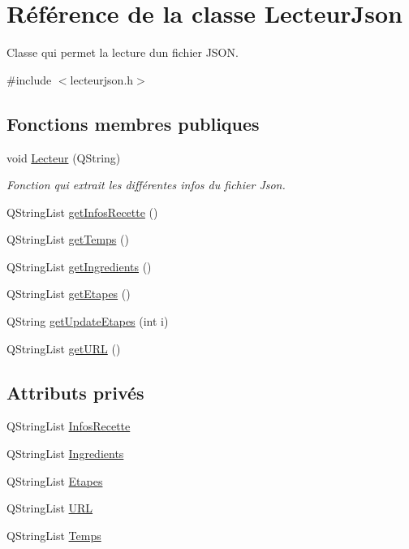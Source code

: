 \hypertarget{class_lecteur_json}{}\section{Référence de la classe Lecteur\+Json}
\label{class_lecteur_json}


Classe qui permet la lecture d\textquotesingle{}un fichier J\+S\+ON.  




{\ttfamily \#include $<$lecteurjson.\+h$>$}

\subsection*{Fonctions membres publiques}
\begin{DoxyCompactItemize}
\item 
void \hyperlink{class_lecteur_json_a6b74dbecd8cb87168fb2d36bc1a22f2b}{Lecteur} (Q\+String)
\begin{DoxyCompactList}\small\item\em Fonction qui extrait les différentes infos du fichier Json. \end{DoxyCompactList}\item 
Q\+String\+List \hyperlink{class_lecteur_json_a0c507870050e16de3688d310d1f3b65a}{get\+Infos\+Recette} ()
\item 
Q\+String\+List \hyperlink{class_lecteur_json_a88d73523c1775a8c7001b5abae152740}{get\+Temps} ()
\item 
Q\+String\+List \hyperlink{class_lecteur_json_a0c18d502de54aea85b4d76f1b2858423}{get\+Ingredients} ()
\item 
Q\+String\+List \hyperlink{class_lecteur_json_ab698142bf586bb224c35962525ce3915}{get\+Etapes} ()
\item 
Q\+String \hyperlink{class_lecteur_json_ad3a86b8dc577d1e6d77a66b8ece8442a}{get\+Update\+Etapes} (int i)
\item 
Q\+String\+List \hyperlink{class_lecteur_json_a4ceacda970b2b838bb41211decdd799f}{get\+U\+RL} ()
\end{DoxyCompactItemize}
\subsection*{Attributs privés}
\begin{DoxyCompactItemize}
\item 
Q\+String\+List \hyperlink{class_lecteur_json_a567a5bb99e9883f7906a89a46e322495}{Infos\+Recette}
\item 
Q\+String\+List \hyperlink{class_lecteur_json_a0648021cfe10db3555625e63c14961f9}{Ingredients}
\item 
Q\+String\+List \hyperlink{class_lecteur_json_a9328054d9a7e7f446cb047cab54c7b45}{Etapes}
\item 
Q\+String\+List \hyperlink{class_lecteur_json_ac4e3585c5c083c669273346ac6910353}{U\+RL}
\item 
Q\+String\+List \hyperlink{class_lecteur_json_a46972b215d8f7d30f68e7cf9c5711fc1}{Temps}
\end{DoxyCompactItemize}


